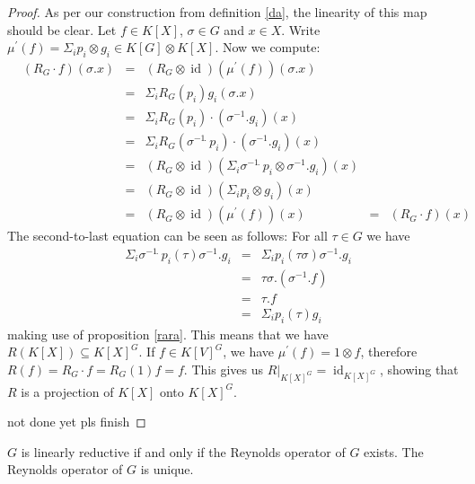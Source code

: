 \begin{proof}
  As per our construction from definition \ref{da}, the linearity of this map should be clear.
  Let $f \in K[X]$, $\sigma \in G$ and $x \in X$.
  Write $\mu^\prime (f) = \Sigma_i p_i \otimes g_i \in K[G] \otimes K[X] $.
  Now we compute:
  \begin{equation}
    \begin{aligned}
      &\left( R_G \cdot f \right) (\sigma.x)
      &=& \left( R_G \otimes \operatorname{id} \right) \left( \mu^\prime(f) \right) \left( \sigma.x \right) \\
      &&=& \Sigma_i R_G \left( p_i \right)  g_i \left( \sigma . x \right) \\
      &&=& \Sigma_i R_G (p_i) \cdot (\sigma^{-1} . g_i) (x)\\
      &&=& \Sigma_i R_G (\sigma^{-1} \dot{\phantom{.}} p_i) \cdot (\sigma^{-1}.g_i) (x)\\
      &&=&(R_G \otimes \operatorname{id}) \left( \Sigma_i \sigma^{-1} \dot{\phantom{.}} p_i \otimes \sigma^{-1}.g_i \right) (x) \\
      &&=& (R_G \otimes \operatorname{id}) \left( \Sigma_i p_i \otimes g_i \right) (x) \\
      &&=& (R_G \otimes \operatorname{id}) (\mu^\prime (f)) (x)
      &=& (R_G \cdot f) (x)
    \end{aligned}
  \end{equation}
  The second-to-last equation can be seen as follows:
  For all $\tau \in G$ we have
  \begin{equation}
    \begin{aligned}
      & \Sigma_i \sigma^{-1} \dot{\phantom{.}} p_i (\tau) \sigma^{-1} . g_i
      &=& \Sigma_i  p_i (\tau \sigma) \sigma^{-1} . g_i\\
      &&=& \tau \sigma . (\sigma^{-1} . f) \\
      &&=& \tau . f \\
      &&=& \Sigma_i p_i (\tau) g_i
    \end{aligned}
  \end{equation}
  making use of proposition \ref{rara}.
  This means that we have $R(K[X]) \subseteq K[X]^G$.
  If $f \in K[V]^G$, we have $\mu^\prime (f) = 1 \otimes f$, therefore $R(f) = R_G \cdot f = R_G (1)f = f$.
  This gives us $\left. R \right|_{K[X]^G} = \operatorname{id}_{K[X]^G}$, showing that $R$ is a projection of $K[X]$ onto $K[X]^G$.
  
  
  not done yet pls finish
\end{proof}

\begin{corollary}
  $G$ is linearly reductive if and only if the Reynolds operator of $G$ exists.
  The Reynolds operator of $G$ is unique.
\end{corollary}
